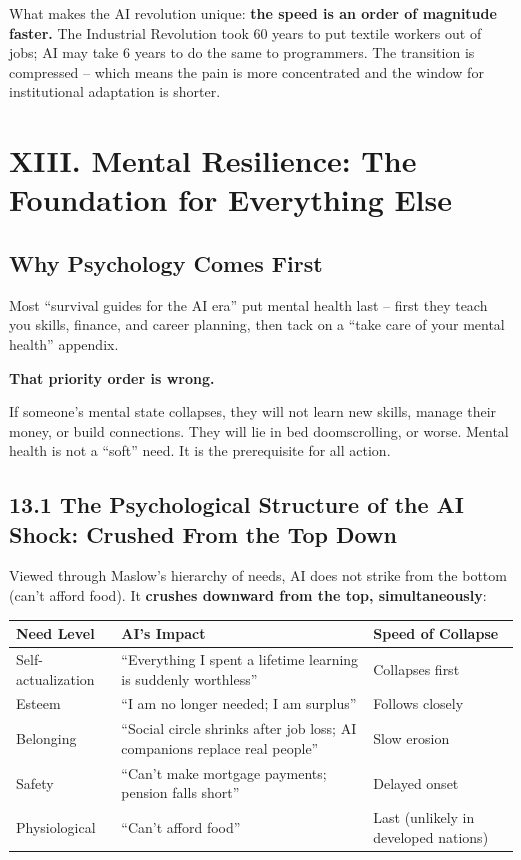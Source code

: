 \documentclass[11pt,a4paper]{article}
\begin{document}
What makes the AI revolution unique: \textbf{the speed is an order of magnitude faster.} The Industrial Revolution took 60 years to put textile workers out of jobs; AI may take 6 years to do the same to programmers. The transition is compressed -- which means the pain is more concentrated and the window for institutional adaptation is shorter.

\section{XIII. Mental Resilience: The Foundation for Everything Else}

\subsection{Why Psychology Comes First}

Most ``survival guides for the AI era'' put mental health last -- first they teach you skills, finance, and career planning, then tack on a ``take care of your mental health'' appendix.

\textbf{That priority order is wrong.}

If someone's mental state collapses, they will not learn new skills, manage their money, or build connections. They will lie in bed doomscrolling, or worse. Mental health is not a ``soft'' need. It is the prerequisite for all action.

\subsection{13.1 The Psychological Structure of the AI Shock: Crushed From the Top Down}

Viewed through Maslow's hierarchy of needs, AI does not strike from the bottom (can't afford food). It \textbf{crushes downward from the top, simultaneously}:

\begin{center}

\begin{tabularx}{\textwidth}{lXX}
\toprule
Need Level & AI's Impact & Speed of Collapse \\
\midrule
Self-actualization & ``Everything I spent a lifetime learning is suddenly worthless'' & Collapses first \\
Esteem & ``I am no longer needed; I am surplus'' & Follows closely \\
Belonging & ``Social circle shrinks after job loss; AI companions replace real people'' & Slow erosion \\
Safety & ``Can't make mortgage payments; pension falls short'' & Delayed onset \\
Physiological & ``Can't afford food'' & Last (unlikely in developed nations) \\
\bottomrule
\end{tabularx}
\end{center}
\end{document}
